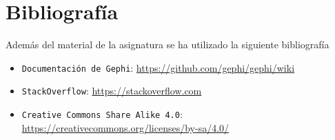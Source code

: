 \chapter{Bibliografía}

Además del material de la asignatura se ha utilizado la siguiente bibliografía

\begin{itemize}
\item{\tt Documentación de Gephi}: \url{https://github.com/gephi/gephi/wiki}
\item{\tt StackOverflow}: \url{https://stackoverflow.com}
\item{\tt Creative Commons Share Alike 4.0}: \url{https://creativecommons.org/licenses/by-sa/4.0/}
\end{itemize}


